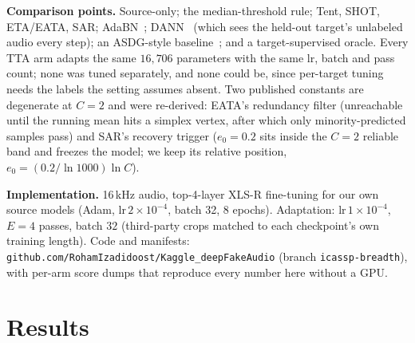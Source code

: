 \documentclass[conference]{IEEEtran}
\begin{document}
\textbf{Comparison points.} Source-only; the median-threshold rule; Tent, SHOT,
ETA/EATA, SAR; AdaBN~\cite{adabn}; DANN~\cite{dann} (which sees the held-out
target's unlabeled audio every step); an ASDG-style baseline~\cite{asdg}; and a
target-supervised oracle. Every TTA arm adapts the same $16{,}706$ parameters
with the same lr, batch and pass count; none was tuned separately, and none could
be, since per-target tuning needs the labels the setting assumes absent. Two
published constants are degenerate at $C{=}2$ and were re-derived: EATA's
redundancy filter (unreachable until the running mean hits a simplex vertex,
after which only minority-predicted samples pass) and SAR's recovery trigger
($e_0{=}0.2$ sits inside the $C{=}2$ reliable band and freezes the model; we keep
its relative position, $e_0{=}(0.2/\ln 1000)\ln C$).

\textbf{Implementation.} 16\,kHz audio, top-4-layer XLS-R fine-tuning for our own
source models (Adam, lr\,$2{\times}10^{-4}$, batch 32, 8 epochs). Adaptation:
lr\,$1{\times}10^{-4}$, $E{=}4$ passes, batch $32$ (third-party crops matched to
each checkpoint's own training length). Code and manifests:
\texttt{github.com/RohamIzadidoost/Kaggle\_deepFakeAudio}
(branch \texttt{icassp-breadth}), with per-arm score dumps that reproduce every
number here without a GPU.

\section{Results}
\label{sec:results}
\end{document}
